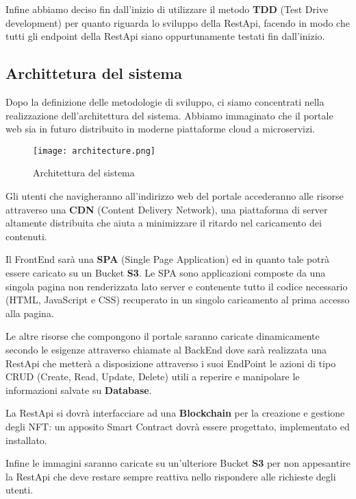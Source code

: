 Infine abbiamo deciso fin dall'inizio di utilizzare il metodo \textbf{TDD} (Test Drive development) per quanto riguarda lo sviluppo della RestApi,
facendo in modo che tutti gli endpoint della RestApi siano oppurtunamente testati fin dall'inizio.

\clearpage

\subsection{Archittetura del sistema}
Dopo la definizione delle metodologie di sviluppo, ci siamo concentrati nella realizzazione dell'architettura del sistema.
Abbiamo immaginato che il portale web sia in futuro distribuito in moderne piattaforme cloud a microservizi.

\begin{figure}[H]
	\centering
	\texttt{[image: architecture.png]}
	\caption{Architettura del sistema}
	\label{fig:architecture}
\end{figure}

Gli utenti che navigheranno all'indirizzo web del portale accederanno alle risorse attraverso una \textbf{CDN} (Content Delivery Network),
una piattaforma di server altamente distribuita che aiuta a minimizzare il ritardo nel caricamento dei contenuti.

Il FrontEnd sarà una \textbf{SPA} (Single Page Application) ed in quanto tale potrà essere caricato su un Bucket \textbf{S3}. 
Le SPA sono applicazioni composte da una singola pagina non renderizzata lato server e
contenente tutto il codice necessario (HTML, JavaScript e CSS) recuperato in un singolo caricamento al prima accesso alla pagina.

Le altre risorse che compongono il portale saranno caricate dinamicamente secondo le esigenze attraverso chiamate al BackEnd dove sarà realizzata una RestApi 
che metterà a disposizione attraverso i suoi EndPoint le azioni di tipo CRUD (Create, Read, Update, Delete) 
utili a reperire e manipolare le informazioni salvate su \textbf{Database}.

La RestApi si dovrà interfacciare ad una \textbf{Blockchain} per la creazione e gestione degli NFT: un apposito Smart Contract dovrà essere progettato, implementato ed installato.

Infine le immagini saranno caricate su un'ulteriore Bucket \textbf{S3} per non appesantire la RestApi 
che deve restare sempre reattiva nello rispondere alle richieste degli utenti.


